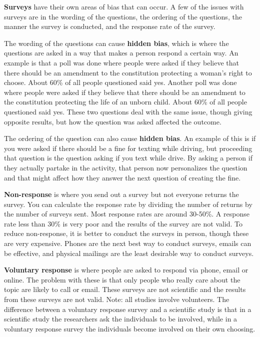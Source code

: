 \documentclass[]{book}
\begin{document}
\textbf{Surveys} have their own areas of bias that can occur. A few of the issues with surveys are in the wording of the questions, the ordering of the questions, the manner the survey is conducted, and the response rate of the survey.

The wording of the questions can cause \textbf{hidden bias}, which is where the questions are asked in a way that makes a person respond a certain way. An example is that a poll was done where people were asked if they believe that there should be an amendment to the constitution protecting a woman's right to choose. About 60\% of all people questioned said yes. Another poll was done where people were asked if they believe that there should be an amendment to the constitution protecting the life of an
unborn child. About 60\% of all people questioned said yes. These two questions deal with the same issue, though giving opposite results, but how the question was asked affected the outcome.

The ordering of the question can also cause \textbf{hidden bias}. An example of this is if you were asked if there should be a fine for texting while driving, but proceeding that question is the question asking if you text while drive. By asking a person if they actually partake in the activity, that person now personalizes the question and that might affect how they answer the next question of creating the fine.

\textbf{Non-response} is where you send out a survey but not everyone returns the survey. You can calculate the response rate by dividing the number of returns by the number of surveys sent. Most response rates are around 30-50\%. A response rate less than 30\% is very poor and the results of the survey are not valid. To reduce non-response, it is better to conduct the surveys in person, though these are very expensive. Phones are the next best way to conduct surveys, emails can be effective, and physical mailings are the least desirable way to conduct surveys.

\textbf{Voluntary response} is where people are asked to respond via phone, email or online. The problem with these is that only people who really care about the topic are likely to call or email. These surveys are not scientific and the results from these surveys are not valid. Note: all studies involve volunteers. The difference between a voluntary response survey and a scientific study is that in a scientific study the researchers ask the individuals to be involved, while in a voluntary response survey the individuals become involved on their own choosing.
\end{document}
